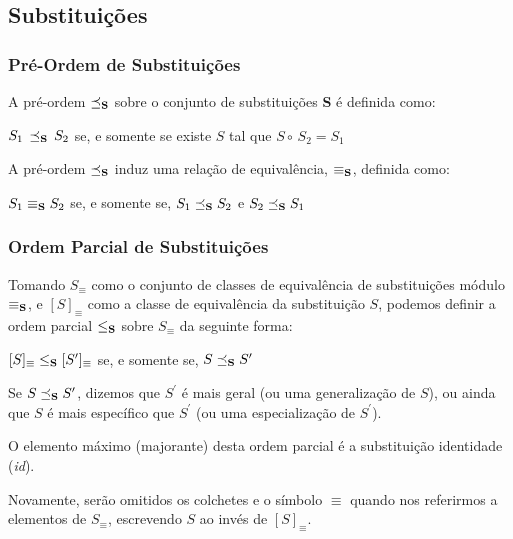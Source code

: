 \subsection{Substitui\c{c}\~oes}

\subsubsection{Pr\'e-Ordem de Substitui\c{c}\~oes}

A pr\'e-ordem $\preceq_{\text{\textbf{S}}}$ sobre o conjunto de substitui\c{c}\~oes \textbf{S} \'e definida como:
\begin{center}
	$S_{1}\,\preceq_{\text{\textbf{S}}}\,S_{2}$ se, e somente se existe $S$ tal que $S\circ\,S_{2}=S_{1}$
\end{center}
A pr\'e-ordem $\preceq_{\text{\textbf{S}}}$ induz uma rela\c{c}\~ao de equival\^encia, $\equiv_{\text{\textbf{S}}}$,
definida como:
\begin{center}
	$S_{1}\equiv_{\text{\textbf{S}}}S_{2}$ se, e somente se, $S_{1}\preceq_{\text{\textbf{S}}}S_{2}$ e 
	$S_{2}\preceq_{\text{\textbf{S}}}S_{1}$  
\end{center}

\subsubsection{Ordem Parcial de Substitui\c{c}\~oes}

Tomando $S_{\equiv}$ como o conjunto de classes de equival\^encia de substitui\c{c}\~oes m\'odulo 
$\equiv_{\text{\textbf{S}}}$, e $[S]_{\equiv}$ como a classe de equival\^encia da substitui\c{c}\~ao $S$, podemos definir
a ordem parcial $\leq_{\text{\textbf{S}}}$ sobre $S_{\equiv}$ da seguinte forma:
\begin{center}
	$[S]_{\equiv}\leq_{\text{\textbf{S}}}[S^{\prime}]_{\equiv}$ se, e somente se, 
	$S\preceq_{\text{\textbf{S}}}S^{\prime}$ 
\end{center}

Se $S\preceq_{\text{\textbf{S}}}S^{\prime}$, dizemos que $S^{\prime}$ \'e mais geral (ou uma generaliza\c{c}\~ao de 
$S$), ou ainda que $S$ \'e mais espec\'ifico que $S^{\prime}$ (ou uma especializa\c{c}\~ao de $S^{\prime}$).

O elemento m\'aximo (majorante) desta ordem parcial \'e a substitui\c{c}\~ao identidade (\textit{id}).

Novamente, ser\~ao omitidos os colchetes e o s\'imbolo $\equiv$ quando nos referirmos a elementos de $S_{\equiv}$,
escrevendo $S$ ao inv\'es de $[S]_{\equiv}$.


